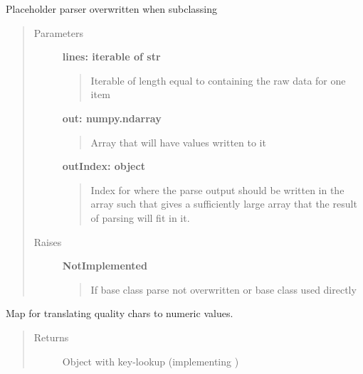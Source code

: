 \documentclass[letterpaper,10pt,english]{sphinxmanual}
\begin{document}
\begin{fulllineitems}
\begin{fulllineitems}
\begin{description}
\end{description}



\end{fulllineitems}


\begin{fulllineitems}
\label{fseq.reading:fseq.reading.seq_encoder.SeqEncoder.parse}
Placeholder parser overwritten when subclassing
\begin{quote}\begin{description}
\item[{Parameters}] \leavevmode
\textbf{lines: iterable of str}
\begin{quote}

Iterable of length equal to  containing the
raw data for one item
\end{quote}

\textbf{out: numpy.ndarray}
\begin{quote}

Array that will have values written to it
\end{quote}

\textbf{outIndex: object}
\begin{quote}

Index for where the parse output should be written in the 
array such that  gives a sufficiently large array
that the result of parsing will fit in it.
\end{quote}

\item[{Raises}] \leavevmode
\textbf{NotImplemented}
\begin{quote}

If base class parse not overwritten or base class used directly
\end{quote}

\end{description}\end{quote}

\end{fulllineitems}


\begin{fulllineitems}
\label{fseq.reading:fseq.reading.seq_encoder.SeqEncoder.qualityEncoding}
Map for translating quality chars to numeric values.
\begin{quote}\begin{description}
\item[{Returns}] \leavevmode
Object with key-lookup (implementing )


\end{description}
\end{quote}
\end{fulllineitems}
\end{fulllineitems}
\end{document}
